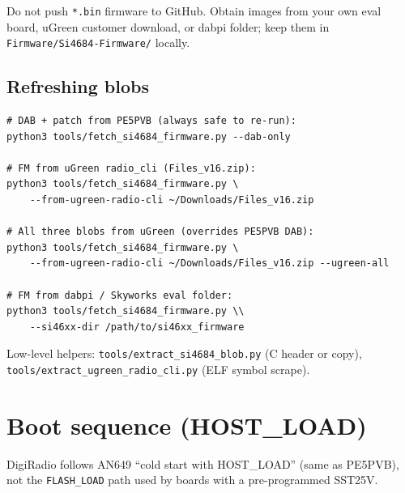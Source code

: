 \begin{drcaution}[Licence]
Do not push \texttt{*.bin} firmware to GitHub. Obtain images from your own
eval board, uGreen customer download, or dabpi folder; keep them in
\texttt{Firmware/Si4684-Firmware/} locally.
\end{drcaution}

\subsection{Refreshing blobs}
\label{sec:si4684-refresh}

\begin{verbatim}
# DAB + patch from PE5PVB (always safe to re-run):
python3 tools/fetch_si4684_firmware.py --dab-only

# FM from uGreen radio_cli (Files_v16.zip):
python3 tools/fetch_si4684_firmware.py \
    --from-ugreen-radio-cli ~/Downloads/Files_v16.zip

# All three blobs from uGreen (overrides PE5PVB DAB):
python3 tools/fetch_si4684_firmware.py \
    --from-ugreen-radio-cli ~/Downloads/Files_v16.zip --ugreen-all

# FM from dabpi / Skyworks eval folder:
python3 tools/fetch_si4684_firmware.py \\
    --si46xx-dir /path/to/si46xx_firmware
\end{verbatim}

Low-level helpers: \texttt{tools/extract\_si4684\_blob.py} (C header or copy),
\texttt{tools/extract\_ugreen\_radio\_cli.py} (ELF symbol scrape).

\section{Boot sequence (HOST\_LOAD)}
\label{sec:si4684-boot}

DigiRadio follows AN649 ``cold start with HOST\_LOAD'' (same as PE5PVB), not
the \texttt{FLASH\_LOAD} path used by boards with a pre-programmed SST25V.

